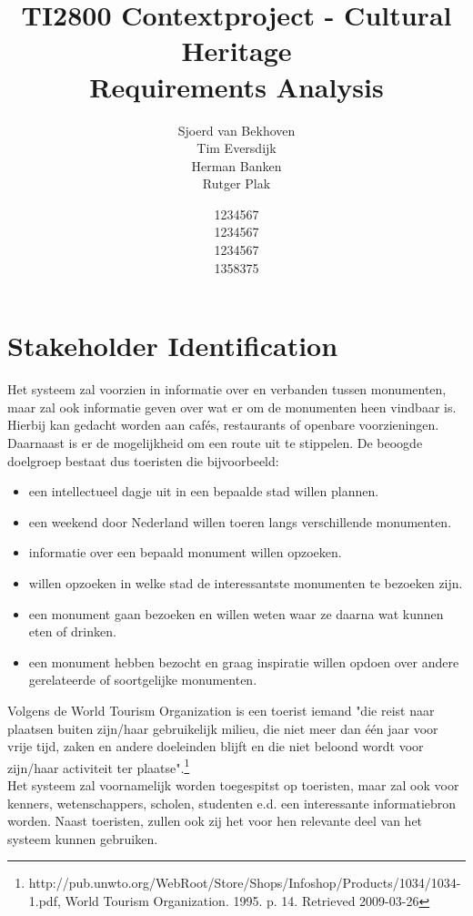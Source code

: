 \documentclass{article}
\begin{document}
\title{TI2800 Contextproject - Cultural Heritage \\ Requirements Analysis}
\author{Sjoerd van Bekhoven \\ Tim Eversdijk \\ Herman Banken \\ Rutger Plak \and 1234567 \\ 1234567 \\ 1234567 \\ 1358375} 
\maketitle

\section{Stakeholder Identification}
Het systeem zal voorzien in informatie over en verbanden tussen monumenten, maar zal ook informatie geven over wat er om de monumenten heen vindbaar is. Hierbij kan gedacht worden aan caf\'es, restaurants of openbare voorzieningen. Daarnaast is er de mogelijkheid om een route uit te stippelen. De beoogde doelgroep bestaat dus toeristen die bijvoorbeeld:
\begin{itemize}
		\item{een intellectueel dagje uit in een bepaalde stad willen plannen.}
		\item{een weekend door Nederland willen toeren langs verschillende monumenten.}
		\item{informatie over een bepaald monument willen opzoeken.}
		\item{willen opzoeken in welke stad de interessantste monumenten te bezoeken zijn.}
		\item{een monument gaan bezoeken en willen weten waar ze daarna wat kunnen eten of drinken.}
		\item{een monument hebben bezocht en graag inspiratie willen opdoen over andere gerelateerde of soortgelijke monumenten.}
\end{itemize}
Volgens de World Tourism Organization is een toerist iemand "die reist naar plaatsen buiten zijn/haar gebruikelijk milieu, die niet meer dan \'e\'en jaar voor vrije tijd, zaken en andere doeleinden blijft en die niet beloond wordt voor zijn/haar activiteit ter plaatse".\footnote{http://pub.unwto.org/WebRoot/Store/Shops/Infoshop/Products/1034/1034-1.pdf, World Tourism Organization. 1995. p. 14. Retrieved 2009-03-26} \\
Het systeem zal voornamelijk worden toegespitst op toeristen, maar zal ook voor kenners, wetenschappers, scholen, studenten e.d. een interessante informatiebron worden. Naast toeristen, zullen ook zij het voor hen relevante deel van het systeem kunnen gebruiken.
\end{document}
